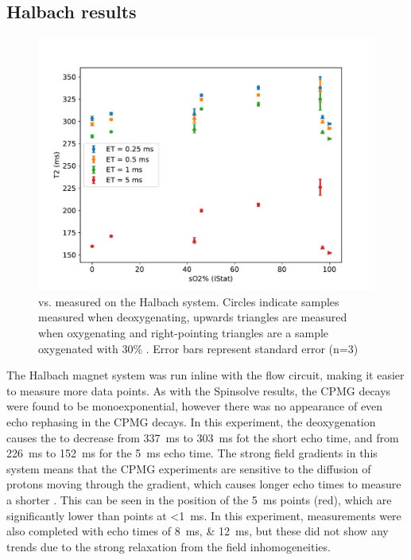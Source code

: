 \subsection{Halbach results}

\begin{figure}[h]
\centering
\includegraphics[width=\textwidth]{figures/stoppedflow/halbachT2SO2.pdf}
\caption[Stopped flow \Ttwo vs. \SOtwo measured on the Halbach system]{\Ttwo vs. \SOtwo measured on the Halbach system. Circles indicate samples measured when deoxygenating, upwards triangles are measured when oxygenating and right-pointing triangles are a sample oxygenated with 30\% \Otwo. Error bars represent standard error (n=3)}
\label{fig:sf-halbachT2SO2}
\end{figure}

The Halbach magnet system was run inline with the flow circuit, making it easier to measure more data points.
As with the Spinsolve results, the CPMG decays were found to be monoexponential, however there was no appearance of even echo rephasing in the CPMG decays.
In this experiment, the deoxygenation causes the \Ttwo to decrease from \SI{337}{ms} to \SI{303}{ms} fot the short echo time, and from \SI{226}{ms} to \SI{152}{ms} for the \SI{5}{ms} echo time.
The strong field gradients in this system means that the CPMG experiments are sensitive to the diffusion of protons moving through the gradient, which causes longer echo times to measure a shorter \Ttwo.
This can be seen in the position of the \SI{5}{ms} points (red), which are significantly lower than points at \textless\SI{1}{ms}.
In this experiment, measurements were also completed with echo times of \SIlist{8;12}{ms}, but these did not show any trends due to the strong relaxation from the field inhomogeneities.

